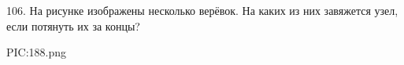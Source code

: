 106. На рисунке изображены несколько верёвок. На каких из них завяжется узел, если потянуть их за концы?
\begin{center}
{{PIC:188.png}}
\end{center}
